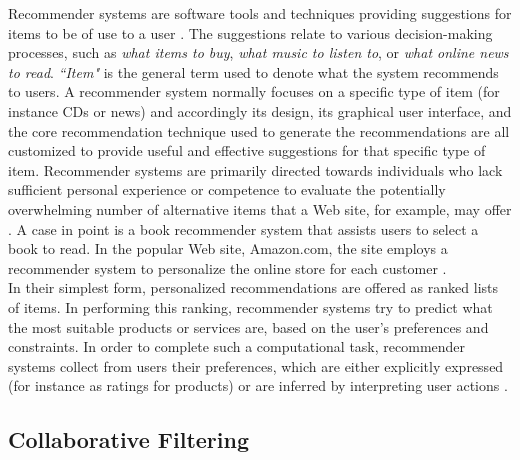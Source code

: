 Recommender systems are software tools and techniques providing
suggestions for items to be of use to a user 
 \cite{Mahmood2009improvingrecommender}. The suggestions relate
to various decision-making processes, such as \textit{what items to
buy}, \textit{what music to listen to}, or \textit{what online news to
read}. \textit{``Item"} is the general term used to denote what the
system recommends to users. A recommender system normally focuses on a
specific type of item (for instance CDs or news) and accordingly its
design, its graphical user interface, and the core recommendation
technique used to generate the recommendations are all customized to
provide useful and effective suggestions for that specific type of item.
Recommender systems are primarily directed towards individuals
who lack sufficient personal experience or competence to evaluate the
potentially overwhelming number of alternative items that a Web site,
for example, may offer  \cite{resnick1997recommender}. 
A case in point is a book recommender
system that assists users to select a book to read. In the popular Web
site, Amazon.com, the site employs a recommender system to personalize
the online store for each customer  \cite{Jannach2006recommendersystems}. \\ 
In their simplest form, personalized recommendations are offered 
as ranked lists of items. In performing this ranking, recommender 
systems try to predict what the most suitable products or services are, 
based on the user’s preferences and constraints.
In order to complete such a computational task, recommender 
systems collect from users their preferences, which are either 
explicitly expressed (for instance as ratings for products) or 
are inferred by interpreting user actions \cite{adomavicius2011context}.

\subsection{Collaborative Filtering}

